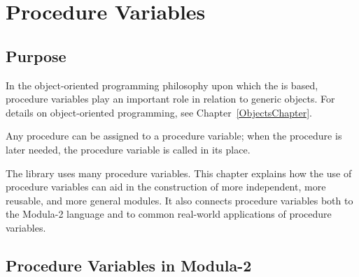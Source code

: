 %
%
%
%

\chapter{Procedure Variables}

\section{Purpose}

In the object-oriented programming philosophy upon which the \library is based,
procedure variables play an important role in relation to generic objects.
For details on object-oriented programming, see Chapter~\ref{ObjectsChapter}.

Any procedure can be assigned to a procedure variable; when the procedure is 
later needed, the procedure variable is called in its place.

The library uses many procedure variables.  This chapter explains how the 
use of
procedure variables can aid in the construction of
more independent, more reusable, and more general modules.  It also
connects procedure variables both to the Modula-2 language and
to common real-world applications of procedure variables.

\section{Procedure Variables in Modula-2}

